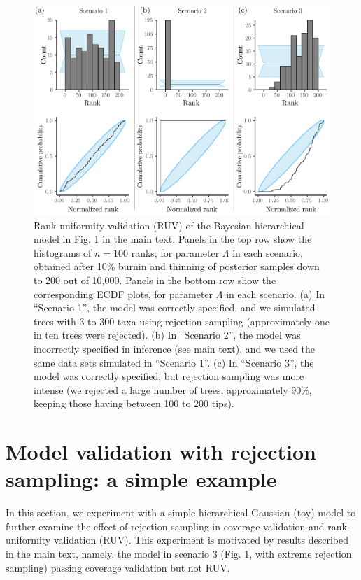 \documentclass[oneside]{article}
\begin{document}
\begin{figure}[!ht]
   \includegraphics[width=\linewidth]{../figures/sbc_Yule_lambda_manual.pdf}
  \caption{Rank-uniformity validation (RUV) of the Bayesian hierarchical model in Fig. 1 in the main text.
    Panels in the top row show the histograms of $n=100$ ranks, for parameter $\Lambda$ in each scenario, obtained after 10\% burnin and thinning of posterior samples down to 200 out of 10,000.
    Panels in the bottom row show the corresponding ECDF plots, for parameter $\Lambda$ in each scenario.
    (a) In ``Scenario 1'', the model was correctly specified, and we simulated trees with 3 to 300 taxa using rejection sampling (approximately one in ten trees were rejected).
    (b) In ``Scenario 2'', the model was incorrectly specified in inference (see main text), and we used the same data sets simulated in ``Scenario 1''.
    (c) In ``Scenario 3'', the model was correctly specified, but rejection sampling was more intense (we rejected a large number of trees, approximately 90\%, keeping those having between 100 to 200 tips).
   }
  \label{supfig:ruv_yule_lambda}
\end{figure}

\newpage
\section{Model validation with rejection sampling: a simple example}
\label{sec:supp_toy}

In this section, we experiment with a simple hierarchical Gaussian (toy) model to further examine the effect of rejection sampling in coverage validation and
rank-uniformity validation (RUV).
This experiment is motivated by results described in the main text, namely, the model in scenario 3 (Fig. 1, with extreme rejection sampling) passing coverage validation but not RUV.
\end{document}
